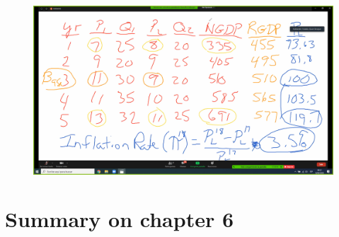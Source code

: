 \documentclass[openany]{book}
\begin{document}
\begin{figure}[H]
    \centering
    \includegraphics[width=14cm]{figs/Captura2.png} 
\end{figure}

\chapter{Summary on chapter 6}



\end{document}
